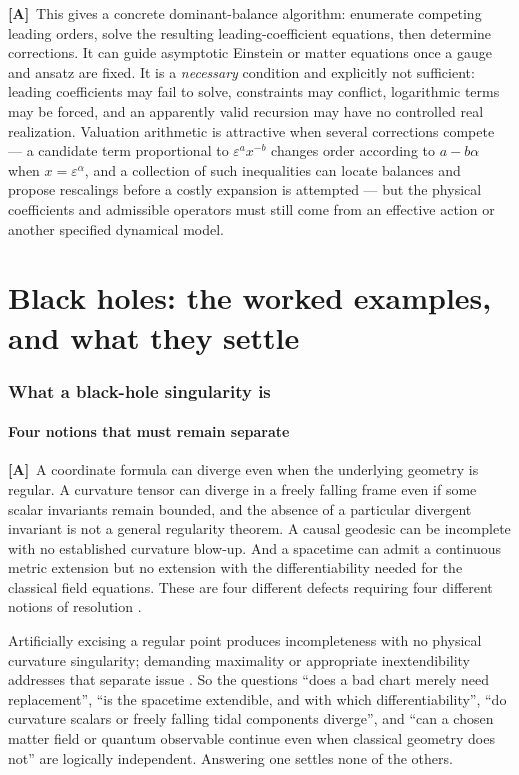 \documentclass[11pt,letterpaper]{article}
\numberwithin{equation}{section}
\theoremstyle{definition}
\theoremstyle{remark}
\newcommand{\eps}{\varepsilon}
\newcommand{\TA}{\textcolor{TierA}{\textsf{\bfseries[A]}}}
\begin{document}
\TA\ This gives a concrete dominant-balance algorithm: enumerate competing
leading orders, solve the resulting leading-coefficient equations, then
determine corrections. It can guide asymptotic Einstein or matter equations
once a gauge and ansatz are fixed. It is a \emph{necessary} condition and
explicitly not sufficient: leading coefficients may fail to solve, constraints
may conflict, logarithmic terms may be forced, and an apparently valid
recursion may have no controlled real realization. Valuation arithmetic is
attractive when several corrections compete --- a candidate term proportional
to $\eps^{a}x^{-b}$ changes order according to $a-b\alpha$ when
$x=\eps^{\alpha}$, and a collection of such inequalities can locate balances
and propose rescalings before a costly expansion is attempted --- but the
physical coefficients and admissible operators must still come from an
effective action or another specified dynamical model.
\part{Black holes: the worked examples, and what they settle}
\label{phys:part:bh}

\section{What a black-hole singularity is}
\label{phys:sec:singularity}

\subsection{Four notions that must remain separate}
\label{phys:sub:fournotions}

\TA\ A coordinate formula can diverge even when the underlying geometry is
regular. A curvature tensor can diverge in a freely falling frame even if some
scalar invariants remain bounded, and the absence of a particular divergent
invariant is not a general regularity theorem. A causal geodesic can be
incomplete with no established curvature blow-up. And a spacetime can admit a
continuous metric extension but no extension with the differentiability needed
for the classical field equations. These are four different defects requiring
four different notions of resolution
\cite{phys:Witten,phys:Landsman,phys:Senovilla,phys:Dafermos,phys:DafermosLuk}.

Artificially excising a regular point produces incompleteness with no physical
curvature singularity; demanding maximality or appropriate inextendibility
addresses that separate issue \cite{phys:Senovilla}. So the questions
``does a bad chart merely need replacement'', ``is the spacetime extendible,
and with which differentiability'', ``do curvature scalars or freely falling
tidal components diverge'', and ``can a chosen matter field or quantum
observable continue even when classical geometry does not'' are logically
independent. Answering one settles none of the others.
\end{document}
